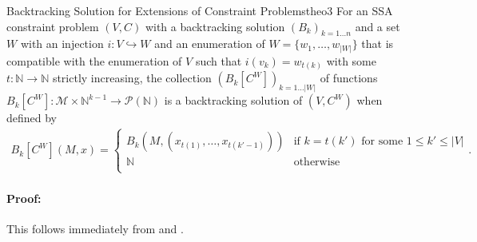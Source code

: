 \begin{theorem}{Backtracking Solution for Extensions of Constraint Problems}{theo3}
    For an SSA constraint problem $(V,C)$ with a backtracking
    solution $(B_k)_{k=1\dots n}$ and a set $W$ with an injection
    $i:V\hookrightarrow W$ and an enumeration of $W=\{w_1,\dots,w_{|W|}\}$ that
    is compatible with the enumeration of $V$ such that $i(v_k)=w_{t(k)}$ with
    some $t:\mathbb N\rightarrow\mathbb N$ strictly increasing, the collection
    $(B_k[C^W])_{k=1\dots |W|}$ of functions
    $B_k[C^W]\colon\mathcal M\times\mathbb N^{k-1}\rightarrow\mathcal P(\mathbb N)$
    is a backtracking solution of $(V,C^W)$ when defined by
    \begin{align*}
        B_k[C^W](M,x)=\left\{
            \begin{array}{ll}
                B_k\left(M,\left(x_{t(1)},\dots,x_{t(k'-1)}\right)\right)&\text{if }k=t(k')\text{ for some }1\leq k'\leq|V|\\
                \mathbb N&\text{otherwise}\\
            \end{array}\right..
    \end{align*}
    \tcblower
    \paragraph*{Proof:}
    This follows immediately from  and .
\end{theorem}
